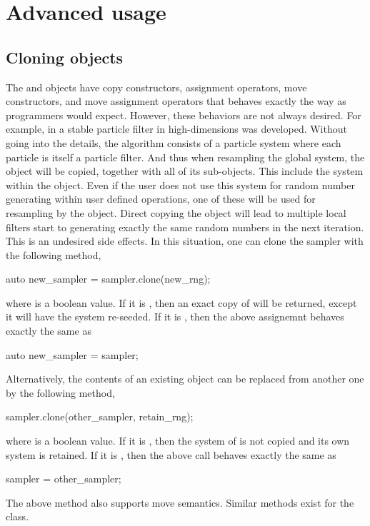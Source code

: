 \section{Advanced usage}
\label{sec:Advanced usage}

\subsection{Cloning objects}
\label{sub:Cloning objects}

The  and  objects have copy
constructors, assignment operators, move constructors, and move assignment
operators that behaves exactly the way as \cpp programmers would expect.
However, these behaviors are not always desired. For example, in
\textcite{stpf} a stable particle filter in high-dimensions was developed.
Without going into the details, the algorithm consists of a particle system
where each particle is itself a particle filter. And thus when resampling the
global system, the  object will be copied, together with
all of its sub-objects. This include the \rng system within the
 object. Even if the user does not use this \rng system
for random number generating within user defined operations, one of these \rng
will be used for resampling by the  object. Direct
copying the  object will lead to multiple local filters
start to generating exactly the same random numbers in the next iteration. This
is an undesired side effects. In this situation, one can clone the sampler with
the following method,
\begin{cppcode}
  auto new_sampler = sampler.clone(new_rng);
\end{cppcode}
where  is a boolean value. If it is , then
an exact copy of  will be returned, except it will have the
\rng system re-seeded. If it is , then the above assignemnt
behaves exactly the same as
\begin{cppcode}
  auto new_sampler = sampler;
\end{cppcode}
Alternatively, the contents of an existing  object can be
replaced from another one by the following method,
\begin{cppcode}
  sampler.clone(other_sampler, retain_rng);
\end{cppcode}
where  is a boolean value. If it is ,
then the \rng system of  is not copied and its own
\rng system is retained. If it is , then the above call
behaves exactly the same as
\begin{cppcode}
  sampler = other_sampler;
\end{cppcode}
The above method also supports move semantics. Similar 
methods exist for the  class.

